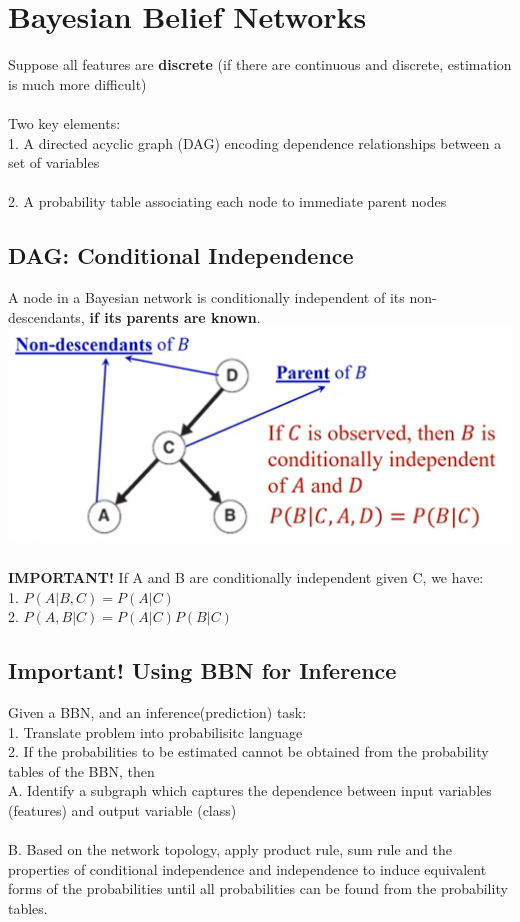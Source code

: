 \section{Bayesian Belief Networks}
Suppose all features are \textbf{discrete} 
(if there are continuous and discrete, estimation is much more difficult)\\\\
Two key elements:\\
1. A directed acyclic graph (DAG) encoding dependence relationships between 
a set of variables\\\\
2. A probability table associating each node to immediate parent nodes

\subsection*{DAG: Conditional Independence}
A node in a Bayesian network is conditionally independent of its 
non-descendants, \textbf{if its parents are known}.
\includegraphics[width=\linewidth]{fig/bbn1}\\\\
\textbf{IMPORTANT!} If A and B are conditionally independent given C, we have:\\
1. $P(A|B,C) = P(A|C)$\\
2. $P(A,B|C) = P(A|C)P(B|C)$
\\

\subsection*{Important! Using BBN for Inference}
Given a BBN, and an inference(prediction) task:\\
1. Translate problem into probabilisitc language\\
2. If the probabilities to be estimated cannot be obtained 
from the probability tables of the BBN, then\\
A. Identify a subgraph which captures the dependence between 
input variables (features) and output variable (class)\\\\
B. Based on the network topology, apply product rule, sum rule
and the properties of conditional independence and independence
to induce equivalent forms of the probabilities until all 
probabilities can be found from the probability tables.